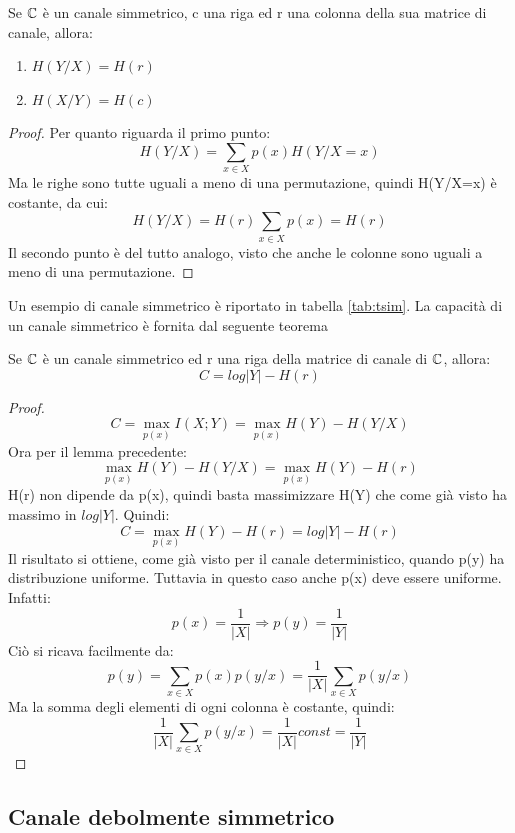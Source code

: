 \begin{lemma}
 Se $\mathbb{C}$ è un canale simmetrico, c una riga ed r una colonna della sua matrice di canale, allora:
 \begin{enumerate}
  \item $H(Y/X)=H(r)$
  \item $H(X/Y)=H(c)$
 \end{enumerate}
 \begin{proof}
  \mbox{}

  \noindent
  Per quanto riguarda il primo punto:
  \[
   H(Y/X)=\sum_{x \in X}p(x)H(Y/X=x)
  \]
  Ma le righe sono tutte uguali a meno di una permutazione, quindi H(Y/X=x) è costante, da cui:
  \[
   H(Y/X)=H(r)\sum_{x \in X}p(x)=H(r)
  \]
  Il secondo punto è del tutto analogo, visto che anche le colonne sono uguali a meno di una permutazione.
 \end{proof}

\end{lemma}

\noindent
Un esempio di canale simmetrico è riportato in tabella \ref{tab:tsim}.
La capacità di un canale simmetrico è fornita dal seguente teorema

\begin{teorema}
 Se $\mathbb{C}$ è un canale simmetrico ed r una riga della matrice di canale di $\mathbb{C}$, allora:
 \[
  C=log|Y| - H(r)
 \]
 \begin{proof}
\[
  C=\max_{p(x)} I(X;Y)=\max_{p(x)} H(Y)-H(Y/X)
\]
 Ora per il lemma precedente:
 \[
  \max_{p(x)} H(Y)-H(Y/X)=\max_{p(x)} H(Y)-H(r)
 \]
 H(r) non dipende da p(x), quindi basta massimizzare H(Y) che come già visto ha massimo in $log|Y|$. Quindi:
 \[
  C=\max_{p(x)} H(Y)-H(r)=log |Y| - H(r)
 \]
 Il risultato si ottiene, come già visto per il canale deterministico, quando p(y) ha distribuzione uniforme.
 Tuttavia in questo caso anche p(x) deve essere uniforme. Infatti:
 \[
  p(x)=\frac{1}{|X|} \Rightarrow p(y)=\frac{1}{|Y|}
 \]
 Ciò si ricava facilmente da:
 \[
  p(y)=\sum_{x \in X} p(x)p(y/x)=\frac{1}{|X|} \sum_{x \in X}p(y/x)
 \]
 Ma la somma degli elementi di ogni colonna è costante, quindi:
 \[
  \frac{1}{|X|} \sum_{x \in X}p(y/x)=\frac{1}{|X|} const=\frac{1}{|Y|}
 \]
 \end{proof}

\end{teorema}

\subsection{Canale debolmente simmetrico}

